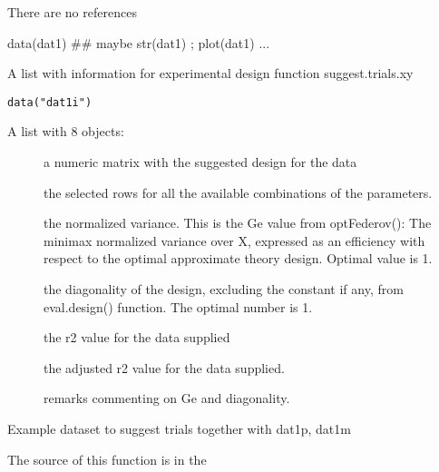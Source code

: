 \documentclass[letterpaper]{book}
\begin{document}
%
\begin{References}\relax
There are no references
\end{References}
%
\begin{Examples}
\begin{ExampleCode}
data(dat1)
## maybe str(dat1) ; plot(dat1) ...
\end{ExampleCode}
\end{Examples}
%
\begin{Description}\relax
A list with information for experimental design function suggest.trials.xy
\end{Description}
%
\begin{Usage}
\begin{verbatim}
data("dat1i")
\end{verbatim}
\end{Usage}
%
\begin{Format}
A list with 8 objects:
\begin{description}

\item[] a numeric matrix with the suggested design for the data
\item[] the selected rows for all the available combinations of the parameters.
\item[] the normalized variance. This is the Ge value from optFederov(): The minimax normalized variance over X, expressed as an efficiency with respect to the optimal approximate theory design. Optimal value is 1.
\item[] the diagonality of the design, excluding the constant if any, from eval.design() function. The optimal number is 1.
\item[] the r2 value for the data supplied
\item[] the adjusted r2 value for the data supplied.
\item[] remarks commenting on Ge and diagonality.

\end{description}

\end{Format}
%
\begin{Details}\relax
Example dataset to suggest trials together with dat1p, dat1m
\end{Details}
%
\begin{Source}\relax
The source of this function is in the
\end{Source}
\end{document}
